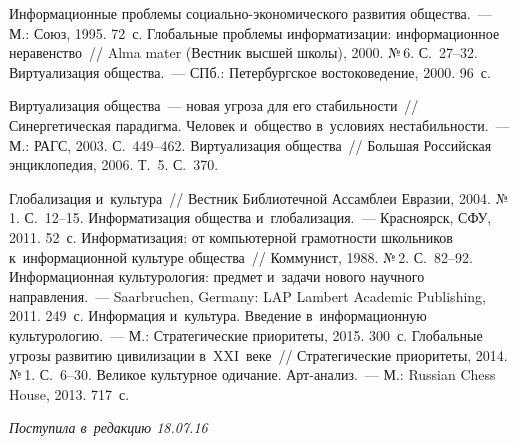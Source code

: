 \begin{multicols}{2}
{{\begin{thebibliography}{99}
 Информационные проб\-ле\-мы  
со\-ци\-аль\-но-эко\-но\-ми\-че\-ско\-го развития общества.~--- М.: Союз, 1995. 72~с.
 Глобальные проблемы информатизации: информационное 
неравенство~// Alma mater (Вестник высшей школы), 2000. №\,6. С.~27--32.
 Виртуализация общества.~--- СПб.: Петербургское востоковедение, 
2000. 96~с.

 Виртуализация общества~--- новая угроза для его стабильности~// 
Синергетическая парадигма. Человек и~общество в~условиях нестабильности.~--- 
М.: РАГС, 2003. С.~449--462.
 Виртуализация общества~// Большая Российская энциклопедия, 
2006. Т.~5. С.~370.

 Глобализация и~культура~// Вестник Биб\-ли\-о\-течной Ассамблеи 
Евразии, 2004. №\,1. С.~12--15.
 Информатизация общества и~глобализация.~--- Красноярск, 
СФУ, 2011. 52~с.
 Информатизация: от компьютерной грамотности школьников 
к~информационной культуре общества~// Коммунист, 1988. №\,2. С.~82--92. 
 Информационная культурология: предмет и~задачи 
нового научного направления.~--- Saarbruchen, Germany: LAP Lambert Academic 
Publishing, 2011. 249~с.
 Информация и~культура. Введение в~информационную 
культурологию.~--- М.: Стратегические приоритеты, 2015. 300~с.
 Глобальные угрозы развитию цивилизации в~XXI~веке~// 
Стратегические приоритеты, 2014. №\,1. С.~6--30.
 Великое культурное одичание. Арт-ана\-лиз.~--- М.: Russian 
Chess House, 2013. 717~с.
\end{thebibliography}

 }
 }

\end{multicols}

\vspace*{-3pt}

\hfill{\small\textit{Поступила в~редакцию 18.07.16}}

\vspace*{8pt}

\newpage

\vspace*{-30pt}


